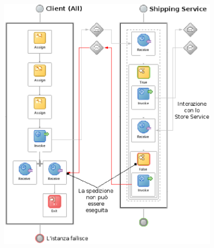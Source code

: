 \begin{figure}[p]
\begin{center}
  \includegraphics[scale=0.85,clip]{blide/dia/Sim2}
   \caption[]{}
  \label{fig:Sim2}
\end{center}
\end{figure}

